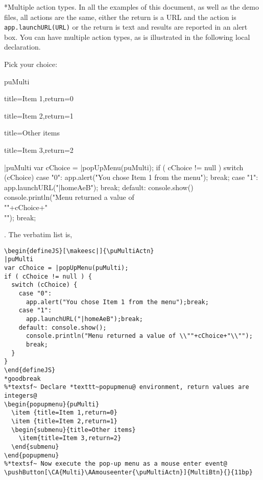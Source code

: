 \documentclass{article}
\makeatletter
\let\amtIndent\leftmargini
\renewcommand*{\theparagraph}{\texorpdfstring{\protect\P\protect\ }{\textparagraph}}
\renewcommand{\paragraph}
    {\renewcommand{\@seccntformat}[1]{\theparagraph}%
    \@startsection{paragraph}{4}{0pt}{6pt}{-3pt}{\bfseries}} %
\makeatother
\begin{document}
\paragraph*{Multiple action types.} In all the examples of this document, as well as the demo files,
all actions are the same, either the return is a URL and the action is
\texttt{app.launchURL(URL)} or the return is text and results are reported in
an alert box. You can have multiple action types, as is illustrated in the
following local declaration.


\newtopic\noindent Pick your choice:
\begin{popupmenu}{puMulti}
  \item {title=Item 1,return=0}
  \item {title=Item 2,return=1}
  \begin{submenu}{title=Other items}
    \item{title=Item 3,return=2}
  \end{submenu}
\end{popupmenu}
\begin{defineJS}[\makeesc|]{\puMultiActn}
|puMulti
var cChoice = |popUpMenu(puMulti);
if ( cChoice != null ) {
  switch (cChoice) {
    case "0":
      app.alert("You chose Item 1 from the menu");
      break;
    case "1":
      app.launchURL("|homeAeB");
      break;
    default:
      console.show()
      console.println("Menu returned a value of \\""+cChoice+"\\"");
      break;
  }
}
\end{defineJS}
\olBdry.
The verbatim list is,
\begin{Verbatim}[xleftmargin=\amtIndent,fontsize=\small,commandchars={*~@}]
%*textsf~ Use the *texttt~defineJS@ environment to define the action@
\begin{defineJS}[\makeesc|]{\puMultiActn}
|puMulti
var cChoice = |popUpMenu(puMulti);
if ( cChoice != null ) {
  switch (cChoice) {
    case "0":
      app.alert("You chose Item 1 from the menu");break;
    case "1":
      app.launchURL("|homeAeB");break;
    default: console.show();
      console.println("Menu returned a value of \\""+cChoice+"\\"");
      break;
  }
}
\end{defineJS}
*goodbreak
%*textsf~ Declare *texttt~popupmenu@ environment, return values are integers@
\begin{popupmenu}{puMulti}
  \item {title=Item 1,return=0}
  \item {title=Item 2,return=1}
  \begin{submenu}{title=Other items}
    \item{title=Item 3,return=2}
  \end{submenu}
\end{popupmenu}
%*textsf~ Now execute the pop-up menu as a mouse enter event@
\pushButton[\CA{Multi}\AAmouseenter{\puMultiActn}]{MultiBtn}{}{11bp}
\end{Verbatim}
\end{document}
